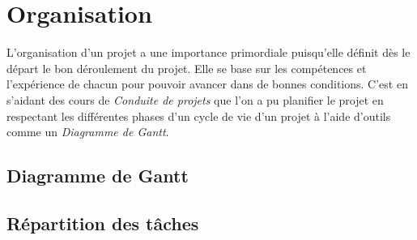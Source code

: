\documentclass{article}
\begin{document}
\newpage


\section{Organisation} %

L'organisation d'un projet a une importance primordiale puisqu'elle définit dès le départ le bon déroulement du projet. Elle se base sur les compétences et l'expérience de chacun pour pouvoir avancer dans de bonnes conditions. C'est en s'aidant des cours de \textit{Conduite de projets} que l'on a pu planifier le projet en respectant les différentes phases d'un cycle de vie d'un projet à l'aide d'outils comme un \textit{Diagramme de Gantt}.

\subsection{Diagramme de Gantt}


\subsection{Répartition des tâches}
\end{document}
